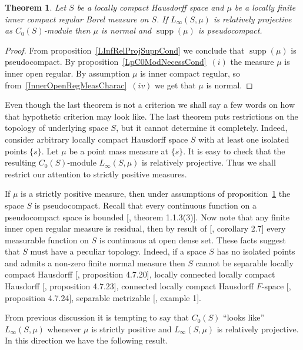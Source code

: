 \documentclass[12pt]{article}
\newtheorem{theorem}{Theorem}[section]
\begin{document}
\begin{theorem}\label{LInfReProjNecessCond} Let $S$ be a locally compact
    Hausdorff space and $\mu$ be a locally finite inner compact regular Borel
    measure on $S$. If $L_\infty(S,\mu)$ is relatively projective as
    $C_0(S)$-module then $\mu$ is normal and
    $\operatorname{supp}(\mu)$ is pseudocompact.

\end{theorem}
\begin{proof} From proposition~\ref{LInfRelProjSuppCond} we conclude 
    that $\operatorname{supp}(\mu)$ is pseudocompact. By 
    proposition~\ref{LpC0ModNecessCond}~$(i)$ the measure $\mu$ is inner open 
    regular. By assumption $\mu$ is inner compact regular, so 
    from~\ref{InnerOpenRegMeasCharac}~$(iv)$ we get that $\mu$ is normal.
\end{proof}

Even though the last theorem is not a criterion we shall say a few words on how
that hypothetic criterion may look like. The last theorem puts restrictions on
the topology of underlying space $S$, but it cannot determine it completely.
Indeed, consider arbitrary locally compact Hausdorff space $S$ with at least one
isolated points $\{s\}$. Let $\mu$ be a point mass measure at $\{s\}$. It is
easy to check that the resulting $C_0(S)$-module $L_\infty(S,\mu)$ is relatively
projective. Thus we shall restrict our attention to strictly positive measures.

If $\mu$ is a strictly positive measure, then under assumptions of
proposition~\ref{LInfReProjNecessCond} the space $S$ is pseudocompact. Recall
that every continuous function on a pseudocompact space is bounded
    [\cite{HrusPseudCompTopSp}, theorem 1.1.3(3)]. Now note that any finite inner
open regular measure is residual, then by result of
    [\cite{ZindResMeasLocCompSp}, corollary 2.7] every measurable function on $S$ is
continuous at open dense set. These facts suggest that $S$ must have a peculiar
topology. Indeed, if a space $S$ has no isolated points and admits a non-zero
finite normal measure then $S$ cannot be separable locally compact Hausdorff
    [\cite{DalesBanSpContFunDualSp}, proposition 4.7.20], locally connected locally
compact Hausdorff [\cite{DalesBanSpContFunDualSp}, proposition 4.7.23],
connected locally compact Hausdorff $F$-space [\cite{DalesBanSpContFunDualSp},
proposition 4.7.24], separable metrizable [\cite{FlachNormMeasTopSp}, example
        1].

From previous discussion it is tempting to say that $C_0(S)$ ``looks like''
$L_\infty(S,\mu)$ whenever $\mu$ is strictly positive and $L_\infty(S,\mu)$ is
relatively projective. In this direction we have the following result.
\end{document}
